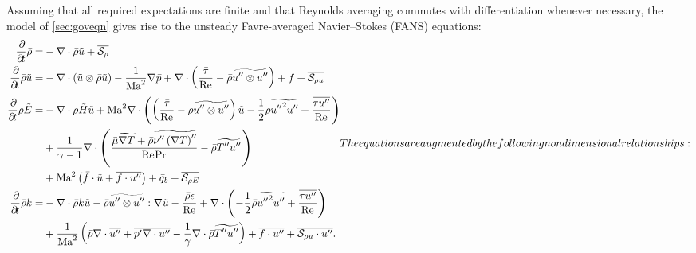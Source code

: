 Assuming that all required expectations are finite and that Reynolds averaging
commutes with differentiation whenever necessary, the model of
\autoref{sec:goveqn} gives rise to the unsteady Favre-averaged
Navier--Stokes (FANS) equations:
\begin{subequations}
\label{eq:fans_all}
\begin{align}
    \frac{\partial\!}{\partial\!t}\bar{\rho}
=
 &- \nabla\cdot\bar{\rho}\tilde{u}
  + \overline{\Ssd_{\rho{}}}
\label{eq:fans_mass}
\\
    \frac{\partial\!}{\partial\!t}\bar{\rho}\tilde{u}
=
 &- \nabla\cdot(\tilde{u}\otimes\bar{\rho}\tilde{u})
  - \frac{1}{\Mach^2}\nabla{}\bar{p}
  + \nabla\cdot\left(
        \frac{\bar{\tau}}{\Reynolds}
      - \bar{\rho} \widetilde{u''\otimes{}u''}
    \right)
  + \bar{f}
  + \overline{\Ssd_{\rho{} u}}
\label{eq:fans_mom}
\\
  \frac{\partial\!}{\partial\!t} \bar{\rho}\tilde{E}
=
 &- \nabla\cdot\bar{\rho}\tilde{H}\tilde{u}
  + \Mach^{2} \nabla\cdot\left(
        \left(
            \frac{\bar{\tau}}{\Reynolds}
          - \bar{\rho} \widetilde{u''\otimes{}u''}
        \right) \tilde{u}
      - \frac{1}{2}\bar{\rho}\widetilde{{u''}^{2}u''}
      + \frac{\overline{\tau{}u''}}{\Reynolds}
    \right)
\notag\\
 &+ \frac{1}{\gamma-1} \nabla\cdot\left(
      \frac{%
         \bar{\mu} \widetilde{\nabla{}T}
       + \bar{\rho} \widetilde{\nu'' \left(\nabla{}T\right)''}
      }{\Reynolds\Prandtl}
      - \bar{\rho} \widetilde{T''u''}
    \right)
\notag\\
 &+ \Mach^{2} \left(
        \bar{f}\cdot\tilde{u}
      + \overline{f\cdot{}u''}
    \right)
  + \bar{q}_b
  + \overline{\Ssd_{\rho{} E}}
\label{eq:fans_energy}
\\
    \frac{\partial\!}{\partial\!t}\bar{\rho}k
=
 &- \nabla\cdot\bar{\rho}k\tilde{u}
  - \bar{\rho} \widetilde{u''\otimes{}u''} : \nabla\tilde{u}
  - \frac{\bar{\rho} \epsilon}{\Reynolds}
  + \nabla\cdot\left(
        -\frac{1}{2}\bar{\rho} \widetilde{{u''}^{2}u''}
      + \frac{\overline{\tau{}u''}}{\Reynolds}
    \right)
\notag\\
 &+ \frac{1}{\Mach^2} \left(
        \bar{p}\nabla\cdot\overline{u''}
      + \overline{p' \nabla\cdot{}u''}
      - \frac{1}{\gamma} \nabla\cdot\bar{\rho} \widetilde{T''u''}
    \right)
  + \overline{f\cdot{}u''}
  + \overline{\Ssd_{\rho{} u}\cdot{}u''}.
\label{eq:fans_tke}
\end{align}
The equations are augmented by the following nondimensional relationships:

\end{subequations}
